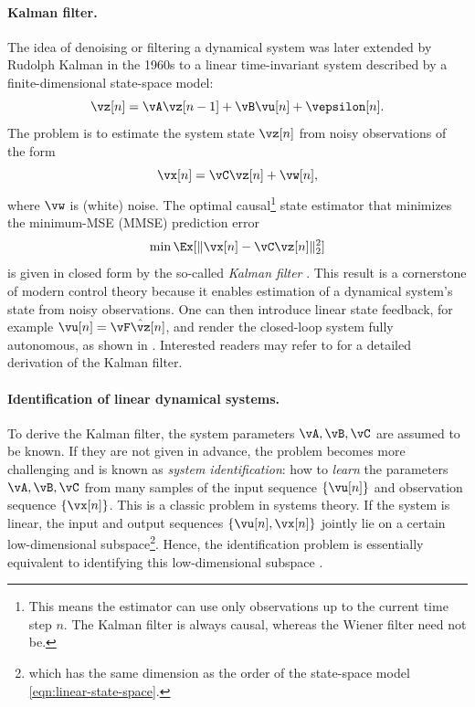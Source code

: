 \documentclass[../../book-main.tex]{subfiles}
\begin{document}
\paragraph{Kalman filter.}
The idea of denoising or filtering a dynamical system was later
extended by Rudolph Kalman in the 1960s to a linear time-invariant
system described by a finite-dimensional state-space model:
\begin{equation}
    \vz[n] = \vA \vz[n-1] + \vB\vu[n] + \vepsilon[n].
    \label{eqn:linear-state-space}
\end{equation}
The problem is to estimate the system state \(\vz[n]\) from noisy
observations of the form
\begin{equation}
    \vx[n] = \vC \vz[n] + \vw[n],
    \label{eqn:Kalman-model}
\end{equation}
where \(\vw\) is (white) noise. The optimal causal\footnote{This
    means the estimator can use only observations up to the current time
    step \(n\). The Kalman filter is always causal, whereas the Wiener
filter need not be.} state estimator that minimizes the minimum-MSE
(MMSE) prediction error
\begin{equation}
    \min \Ex[ \|\vx[n] - \vC\vz[n]\|_{2}^{2}]
    \label{eqn:kalman-mse}
\end{equation}
is given in closed form by the so-called \textit{Kalman filter}
\cite{kalman1960new}. This result is a cornerstone of modern control
theory because it enables estimation of a dynamical system's state
from noisy observations. One can then introduce linear state
feedback, for example \(\vu[n] = \vF \hat{\vz}[n]\), and render the
closed-loop system fully autonomous, as shown in
.  Interested readers may refer to
\cite[Appendix B]{MaY2003} for a detailed derivation of the Kalman filter.

\paragraph{Identification of linear dynamical systems.}
To derive the Kalman filter, the system parameters \(\vA, \vB, \vC\)
are assumed to be known. If they are not given in advance, the
problem becomes more challenging and is known as \textit{system
identification}: how to \textit{learn} the parameters \(\vA, \vB,
\vC\) from many samples of the input sequence \(\{\vu[n]\}\) and
observation sequence \(\{\vx[n]\}\). This is a classic problem in
systems theory. If the system is linear, the input and output
sequences \(\{\vu[n], \vx[n]\}\) jointly lie on a certain
low-dimensional subspace\footnote{which has the same dimension as the
order of the state-space model \eqref{eqn:linear-state-space}.}.
Hence, the identification problem is essentially equivalent to
identifying this low-dimensional subspace
\cite{OverscheeP1996,Liu-2009-CDC,Liu-2010-SIAM}.
\end{document}
